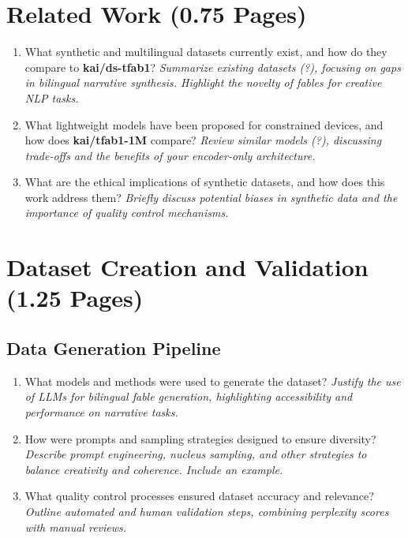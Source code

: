 \documentclass[11pt]{article}
\begin{document}
\section{Related Work (0.75 Pages)}
\begin{enumerate}
    \item What synthetic and multilingual datasets currently exist, and how do they compare to \textbf{kai/ds-tfab1}?  
    \textit{Summarize existing datasets (?), focusing on gaps in bilingual narrative synthesis. Highlight the novelty of fables for creative NLP tasks. \citep{nitu_natural_2024}}

    \item What lightweight models have been proposed for constrained devices, and how does \textbf{kai/tfab1-1M} compare?  
    \textit{Review similar models (?), discussing trade-offs and the benefits of your encoder-only architecture.}

    \item What are the ethical implications of synthetic datasets, and how does this work address them?  
    \textit{Briefly discuss potential biases in synthetic data and the importance of quality control mechanisms.}
\end{enumerate}

\section{Dataset Creation and Validation (1.25 Pages)}
\subsection{Data Generation Pipeline}
\begin{enumerate}
    \item What models and methods were used to generate the dataset?  
    \textit{Justify the use of LLMs for bilingual fable generation, highlighting accessibility and performance on narrative tasks.}

    \item How were prompts and sampling strategies designed to ensure diversity?  
    \textit{Describe prompt engineering, nucleus sampling, and other strategies to balance creativity and coherence. Include an example.}

    \item What quality control processes ensured dataset accuracy and relevance?  
    \textit{Outline automated and human validation steps, combining perplexity scores with manual reviews.}
\end{enumerate}
\end{document}
